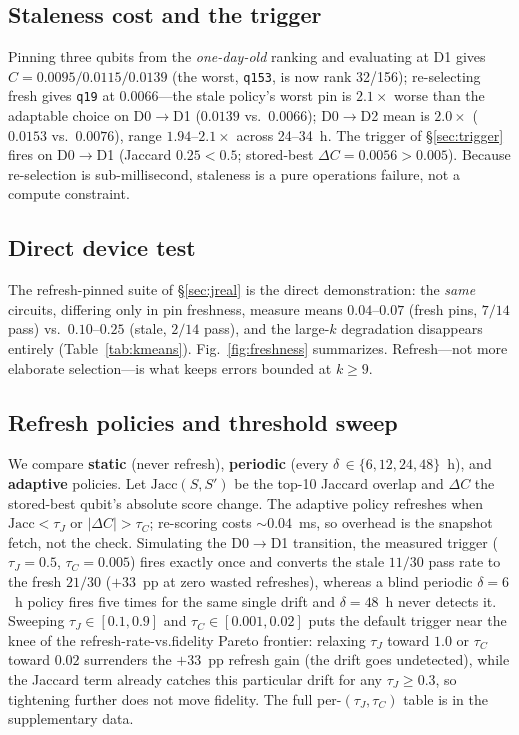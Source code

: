 \documentclass[journal,10pt,twocolumn]{IEEEtran}
\newcommand{\q}[1]{\texttt{q#1}}
\begin{document}
\subsection{Staleness cost and the trigger}
Pinning three qubits from the \emph{one-day-old} ranking and evaluating at D1 gives $C{=}0.0095/0.0115/0.0139$
(the worst, \q{153}, is now rank 32/156); re-selecting fresh gives \q{19} at $0.0066$---the stale policy's worst pin
is $2.1\times$ worse than the adaptable choice on D0$\to$D1 ($0.0139$ vs.\ $0.0066$); D0$\to$D2 mean is $2.0\times$
($0.0153$ vs.\ $0.0076$), range $1.94$--$2.1\times$ across 24--34~h. The trigger of \S\ref{sec:trigger} fires on
D0$\to$D1 (Jaccard $0.25<0.5$; stored-best $\Delta C{=}0.0056>0.005$). Because re-selection is sub-millisecond,
staleness is a pure operations failure, not a compute constraint.

\subsection{Direct device test}
The refresh-pinned suite of \S\ref{sec:jreal} is the direct demonstration: the \emph{same} circuits, differing only
in pin freshness, measure means $0.04$--$0.07$ (fresh pins, $7/14$ pass) vs.\ $0.10$--$0.25$ (stale, $2/14$ pass),
and the large-$k$ degradation disappears entirely (Table~\ref{tab:kmeans}). Fig.~\ref{fig:freshness} summarizes.
Refresh---not more elaborate selection---is what keeps errors bounded at $k\ge9$.

\subsection{Refresh policies and threshold sweep}
\label{sec:policies}
We compare \textbf{static} (never refresh), \textbf{periodic} (every $\delta\,{\in}\{6,12,24,48\}$~h), and
\textbf{adaptive} policies. Let $\mathrm{Jacc}(S,S')$ be the top-10 Jaccard overlap and $\Delta C$ the stored-best
qubit's absolute score change. The adaptive policy refreshes when $\mathrm{Jacc}<\tau_J$ or $|\Delta C|>\tau_C$;
re-scoring costs $\sim0.04$~ms, so overhead is the snapshot fetch, not the check. Simulating the D0$\to$D1
transition, the measured trigger ($\tau_J{=}0.5$, $\tau_C{=}0.005$) fires exactly once and converts the stale
$11/30$ pass rate to the fresh $21/30$ ($+33$~pp at zero wasted refreshes), whereas a blind periodic $\delta{=}6$~h
policy fires five times for the same single drift and $\delta{=}48$~h never detects it. Sweeping
$\tau_J{\in}[0.1,0.9]$ and $\tau_C{\in}[0.001,0.02]$ puts the default trigger near the knee of the
refresh-rate-vs.\-fidelity Pareto frontier: relaxing $\tau_J$ toward $1.0$ or $\tau_C$ toward $0.02$
surrenders the $+33$~pp refresh gain (the drift goes undetected), while the Jaccard term already catches
this particular drift for any $\tau_J{\ge}0.3$, so tightening further does not move fidelity. The full
per-$(\tau_J,\tau_C)$ table is in the supplementary data.
\end{document}
